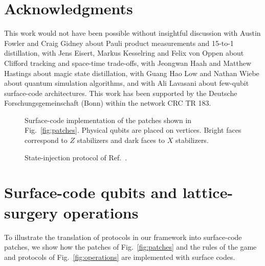 \documentclass[prx,aps,letterpaper,twocolumn,allowfontchageintitle=true,accepted=2019-02-01]{quantumarticle}
\begin{document}
\section*{Acknowledgments}
This work would not have been possible without insightful discussion with Austin Fowler and Craig Gidney about Pauli product measurements and 15-to-1 distillation, with Jens Eisert, Markus Kesselring and Felix von Oppen about Clifford tracking and space-time trade-offs, with Jeongwan Haah and Matthew Hastings about magic state distillation, with Guang Hao Low and Nathan Wiebe about quantum simulation algorithms, and with Ali Lavasani about few-qubit surface-code architectures. This work has been supported by the Deutsche Forschungsgemeinschaft (Bonn) within the network CRC TR 183.






\begin{figure}[!b]
\centering
\def\svgwidth{\linewidth}

\caption{Surface-code implementation of the patches shown in Fig.~\ref{fig:patches}. Physical qubits are placed on vertices. Bright faces correspond to $Z$ stabilizers and dark faces to $X$ stabilizers.}
\label{fig:scpatches}
\end{figure}


\begin{figure}[!t]
\centering
\def\svgwidth{\linewidth}

\caption{State-injection protocol of Ref.~\cite{Landahl2014}.}
\label{fig:stateinjection}
\end{figure}










\appendix


\section{Surface-code qubits and lattice-surgery operations}
\label{app:surfacecode}

To illustrate the translation of protocols in our framework into surface-code patches, we show how the patches of Fig.~\ref{fig:patches} and the rules of the game  and protocols of Fig.~\ref{fig:operations} are implemented with surface codes. %
\end{document}
